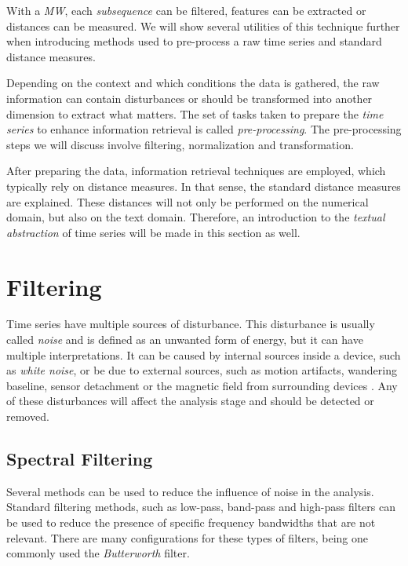     
With a \textit{MW}, each \textit{subsequence} can be filtered, features can be extracted or distances can be measured. We will show several utilities of this technique further when introducing methods used to pre-process a raw time series and standard distance measures.
\par
Depending on the context and which conditions the data is gathered, the raw information can contain disturbances or should be transformed into another dimension to extract what matters. The set of tasks taken to prepare the \textit{time series} to enhance information retrieval is called \textit{pre-processing}. The pre-processing steps we will discuss involve filtering, normalization and transformation.
\par
After preparing the data, information retrieval techniques are employed, which typically rely on distance measures. In that sense, the standard distance measures are explained. These distances will not only be performed on the numerical domain, but also on the text domain. Therefore, an introduction to the \textit{textual abstraction} of time series will be made in this section as well.

\section{Filtering}
\label{sec:filt}

Time series have multiple sources of disturbance. This disturbance is usually called \textit{noise} and is defined as an unwanted form of energy, but it can have multiple interpretations. It can be caused by internal sources inside a device, such as \textit{white noise}, or be due to external sources, such as motion artifacts, wandering baseline, sensor detachment or the magnetic field from surrounding devices \cite{}. Any of these disturbances will affect the analysis stage and should be detected or removed.

\subsection{Spectral Filtering}
\label{subsec:spec_filt}
Several methods can be used to reduce the influence of noise in the analysis. Standard filtering methods, such as low-pass, band-pass and high-pass filters can be used to reduce the presence of specific frequency bandwidths that are not relevant. There are many configurations for these types of filters, being one commonly used the \textit{Butterworth} filter.

